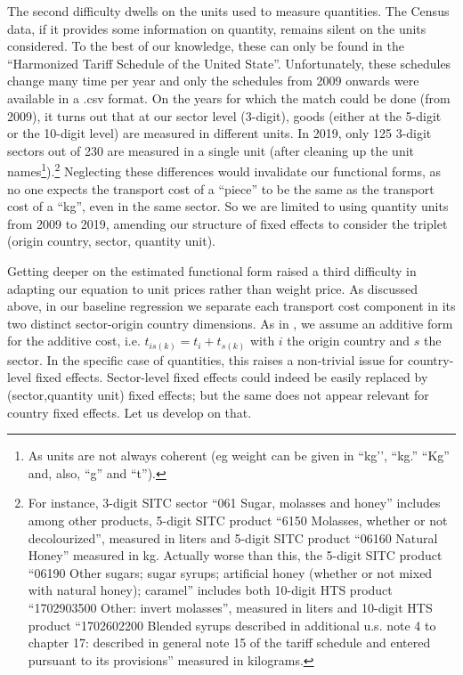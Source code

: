 \documentclass[11pt,twoside, authoryear]{elsarticle}
\begin{document}
The second difficulty dwells on the units used to measure quantities. The Census data, if it provides some information on quantity, remains silent on the units considered. To the best of our knowledge, these can only be found in the ``Harmonized Tariff Schedule of the United State''. Unfortunately, these schedules change many time per year and only the schedules from 2009 onwards were available in a .csv format. On the years for which the match could be done (from 2009), it turns out that at our sector level (3-digit), goods (either at the 5-digit or the 10-digit level) are measured in different units. In 2019, only 125 3-digit sectors out of 230 are measured in a single unit (after cleaning up the unit names\footnote{As units are not always coherent (eg weight can be given in ``kg’’, ``kg.'' ``Kg'' and, also, ``g'' and ``t'').}).\footnote{For instance, 3-digit SITC sector ``061 Sugar, molasses and honey'' includes among other products, 5-digit SITC product ``6150 Molasses, whether or not decolourized'', measured in liters and 5-digit SITC product ``06160 Natural Honey'' measured in kg. Actually worse than this, the 5-digit SITC product ``06190 Other sugars; sugar syrups; artificial honey (whether or not mixed with natural honey); caramel'' includes both 10-digit HTS product ``1702903500 Other: invert molasses'', measured in liters and 10-digit HTS product ``1702602200 Blended syrups described in additional u.s. note 4 to chapter 17: described in general note 15 of the tariff schedule and entered pursuant to its provisions''  measured in kilograms.} Neglecting these differences would invalidate our functional forms, as no one expects the transport cost of a ``piece'' to be the same as the transport cost of a ``kg'', even in the same sector.
So we are limited to using quantity units from 2009 to 2019, amending our structure of fixed effects to consider the triplet (origin country, sector, quantity unit).

Getting deeper on the estimated functional form raised a third difficulty in adapting our equation to unit prices rather than weight price.
As discussed above, in our baseline regression we separate each transport cost component in its two distinct sector-origin country dimensions.
As in \cite{Irrazabal_2015}, we assume an additive form for the additive cost, i.e. $t_{is(k)} = t_i+t_{s(k)}$ with $i$ the origin country and $s$ the sector. In the specific case of quantities, this raises a non-trivial issue for country-level fixed effects. Sector-level fixed effects could indeed be easily replaced by (sector,quantity unit) fixed effects; but the same does not appear relevant for country fixed effects. Let us develop on that.
\end{document}
